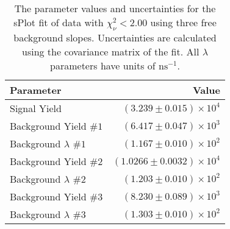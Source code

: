 
\begin{table}[ht]
    \begin{center}
        \begin{tabular}{lr}\toprule
            Parameter & Value \\\midrule
            Signal Yield & $(3.239 \pm 0.015) \times 10^{4}$ \\
            Background Yield $\#1$ & $(6.417 \pm 0.047) \times 10^{3}$ \\
            Background $\lambda$ $\#1$ & $(1.167 \pm 0.010) \times 10^{2}$ \\
            Background Yield $\#2$ & $(1.0266 \pm 0.0032) \times 10^{4}$ \\
            Background $\lambda$ $\#2$ & $(1.203 \pm 0.010) \times 10^{2}$ \\
            Background Yield $\#3$ & $(8.230 \pm 0.089) \times 10^{3}$ \\
            Background $\lambda$ $\#3$ & $(1.303 \pm 0.010) \times 10^{2}$ \\\bottomrule
        \end{tabular}
        \caption{The parameter values and uncertainties for the sPlot fit of data with $\chi^2_\nu < 2.00$ using three free background slopes. Uncertainties are calculated using the covariance matrix of the fit. All $\lambda$ parameters have units of $\si{\nano\second}^{-1}$.}\label{tab:splot-fit-results-chisqdof-2.00-free-3}
    \end{center}
\end{table}
